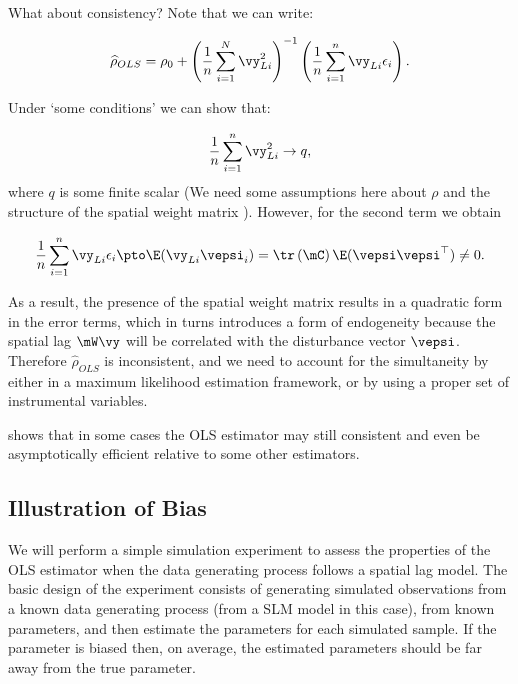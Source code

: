 What about consistency? Note that we can write: 

\begin{equation}
          \widehat{\rho}_{OLS} = \rho_0 + \left(\frac{1}{n}\sum_{i = 1}^N \vy_{Li}^2\right)^{-1}\left(\frac{1}{n}\sum_{i = 1}^{n}\vy_{Li}\epsilon_i\right).
\end{equation}

Under `some conditions' we can show that:

\begin{equation}
\frac{1}{n}\sum_{i = 1}^n \vy_{Li}^2 \to q,
\end{equation}
%
where $q$ is some finite scalar (We need some assumptions here about $\rho$ and the structure of the spatial weight matrix ). However, for the second term we obtain

\begin{equation}
  \frac{1}{n}\sum_{i = 1}^{n}\vy_{Li}\epsilon_i \pto \E(\vy_{Li}\vepsi_i) = \tr \left(\mC\right) \E(\vepsi\vepsi^\top) \neq 0.
\end{equation}

As a result, the presence of the spatial weight matrix results in a quadratic form in the error terms, which in turns introduces a form of endogeneity because the spatial lag $\mW\vy$ will be correlated with the disturbance vector $\vepsi$. Therefore $\widehat{\rho}_{OLS}$ is inconsistent, and we need to account for the simultaneity by either in a maximum likelihood estimation framework, or by using a proper set of instrumental variables.

\begin{remark}
  \cite{lee2002consistency} shows that in some cases the OLS estimator may still consistent and even be asymptotically efficient relative to some other estimators.
\end{remark}


\subsection{Illustration of Bias}

We will perform a simple simulation experiment to assess the properties of the OLS estimator when the data generating process follows a spatial lag model. The basic design of the experiment consists of generating simulated observations from a known data generating process (from a SLM model in this case), from known parameters, and then estimate the parameters for each simulated sample. If the parameter is biased then, on average, the estimated parameters should be far away from the true parameter.

